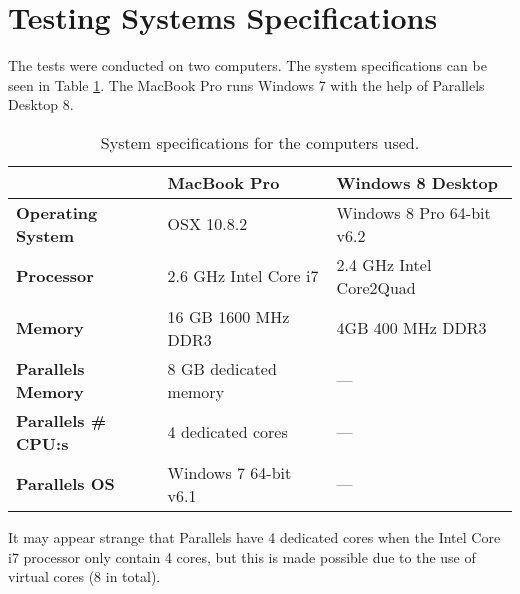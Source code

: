 \section{Testing Systems Specifications} \label{sec:system_specs}
The tests were conducted on two computers. The system specifications can be seen in Table \ref{table:system_specs}. The MacBook Pro runs Windows 7 with the help of Parallels Desktop 8. 

\begin{table}[h]
	\begin{center}
		\begin{tabular} { m{4cm} | m{4cm}  | m{5cm} }
			\hline
			\textbf{} & \textbf{MacBook Pro} & 
			\textbf{Windows 8 Desktop}  \\ \hline

			\textbf{Operating System}		& OSX 10.8.2 
											& Windows 8 Pro 64-bit v6.2 \\ \hline

			\textbf{Processor}				& 2.6 GHz Intel Core i7 
											& 2.4 GHz Intel Core2Quad  \\ \hline

			\textbf{Memory}					& 16 GB 1600 MHz DDR3
											& 4GB 400 MHz DDR3 \\ \hline

			\textbf{Parallels Memory}		& 8 GB dedicated memory 
											& --- \\ \hline

			\textbf{Parallels \# CPU:s} 	& 4 dedicated cores
											& --- \\ \hline

			\textbf{Parallels OS} 			& Windows 7 64-bit v6.1
											& --- \\ \hline
		\end{tabular}
	\end{center}
	\caption{System specifications for the computers used.}
	\label{table:system_specs}
\end{table}
It may appear strange that Parallels have 4 dedicated cores when the Intel Core i7 processor only contain 4 cores, but this is made possible due to the use of virtual cores (8 in total).



